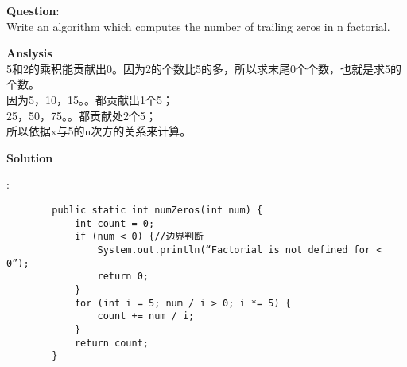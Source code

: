     
\begin{description}
    \item{\textbf{Question}}:\\%
		Write an algorithm which computes the number of trailing zeros in n factorial.

    \item{\textbf{Anslysis}}\\
		5和2的乘积能贡献出0。因为2的个数比5的多，所以求末尾0个个数，也就是求5的个数。\\
		因为5，10，15。。都贡献出1个5；\\
		25，50，75。。都贡献处2个5；\\
		所以依据x与5的n次方的关系来计算。

    \item{\textbf{Solution}}
	\item{} : \\
		\begin{lstlisting}
		public static int numZeros(int num) {
			int count = 0;
			if (num < 0) {//边界判断
				System.out.println(“Factorial is not defined for < 0”);
				return 0;
			}
			for (int i = 5; num / i > 0; i *= 5) {
				count += num / i;
			}
			return count;
		}
		\end{lstlisting}

\end{description}

